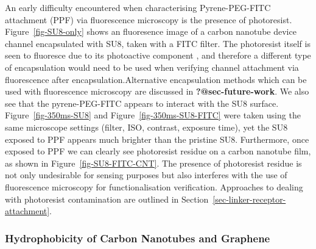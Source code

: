 \documentclass[
  a4paper,
]{scrbook}
\begin{document}
An early difficulty encountered when characterising Pyrene-PEG-FITC
attachment (PPF) via fluorescence microscopy is the presence of
photoresist. Figure~\ref{fig-SU8-only} shows an fluoresence image of a
carbon nanotube device channel encapsulated with SU8, taken with a FITC
filter. The photoresist itself is seen to fluoresce due to its
photoactive component \autocite{Pai2007}, and therefore a different type
of encapsulation would need to be used when verifying channel attachment
via fluorescence after encapsulation.Alternative encapsulation methods
which can be used with fluorescence microscopy are discussed in
\textbf{?@sec-future-work}. We also see that the pyrene-PEG-FITC appears
to interact with the SU8 surface. Figure~\ref{fig-350ms-SU8} and
Figure~\ref{fig-350ms-SU8-FITC} were taken using the same microscope
settings (filter, ISO, contrast, exposure time), yet the SU8 exposed to
PPF appears much brighter than the pristine SU8. Furthermore, once
exposed to PPF we can clearly see photoresist residue on a carbon
nanotube film, as shown in Figure~\ref{fig-SU8-FITC-CNT}. The presence
of photoresist residue is not only undesirable for sensing purposes but
also interferes with the use of fluorescence microscopy for
functionalisation verification. Approaches to dealing with photoresist
contamination are outlined in
Section~\ref{sec-linker-receptor-attachment}.

\hypertarget{hydrophobicity-of-carbon-nanotubes-and-graphene}{%
\subsubsection*{Hydrophobicity of Carbon Nanotubes and
Graphene}\label{hydrophobicity-of-carbon-nanotubes-and-graphene}}
\end{document}
